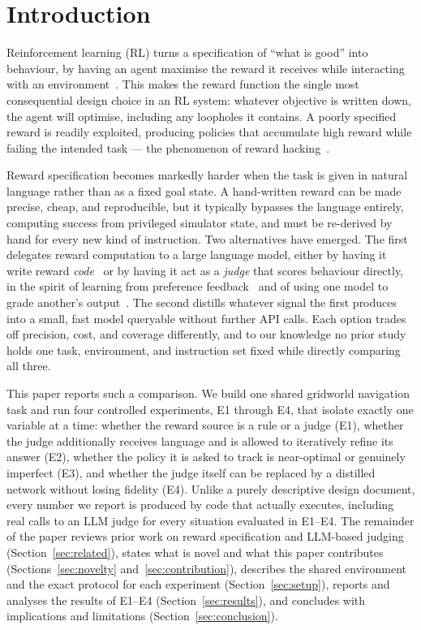 \documentclass[10pt,twocolumn]{article}
\begin{document}
\section{Introduction}
\label{sec:intro}

Reinforcement learning (RL) turns a specification of ``what is good''
into behaviour, by having an agent maximise the reward it receives while
interacting with an environment~\citep{sutton2018rl}. This makes the
reward function the single most consequential design choice in an RL
system: whatever objective is written down, the agent will optimise,
including any loopholes it contains. A poorly specified reward is
readily exploited, producing policies that accumulate high reward while
failing the intended task --- the phenomenon of reward
hacking~\citep{amodei2016concrete}.

Reward specification becomes markedly harder when the task is given in
natural language rather than as a fixed goal state. A hand-written
reward can be made precise, cheap, and reproducible, but it typically
bypasses the language entirely, computing success from privileged
simulator state, and must be re-derived by hand for every new kind of
instruction. Two alternatives have emerged. The first delegates reward
computation to a large language model, either by having it write reward
\emph{code}~\citep{ma2024eureka,xie2024text2reward} or by having it act
as a \emph{judge} that scores behaviour directly, in the spirit of
learning from preference feedback~\citep{christiano2017rlhf} and of
using one model to grade another's output~\citep{zheng2023judging}. The
second distills whatever signal the first produces into a small, fast
model queryable without further API calls. Each option trades off
precision, cost, and coverage differently, and to our knowledge no prior
study holds one task, environment, and instruction set fixed while
directly comparing all three.

This paper reports such a comparison. We build one shared gridworld
navigation task and run four controlled experiments, E1 through E4, that
isolate exactly one variable at a time: whether the reward source is a
rule or a judge (E1), whether the judge additionally receives language
and is allowed to iteratively refine its answer (E2), whether the policy
it is asked to track is near-optimal or genuinely imperfect (E3), and
whether the judge itself can be replaced by a distilled network without
losing fidelity (E4). Unlike a purely descriptive design document, every
number we report is produced by code that actually executes, including
real calls to an LLM judge for every situation evaluated in E1--E4. The
remainder of the paper reviews prior work on reward specification and
LLM-based judging (Section~\ref{sec:related}), states what is novel and
what this paper contributes (Sections~\ref{sec:novelty}
and~\ref{sec:contribution}), describes the shared environment and the
exact protocol for each experiment
(Section~\ref{sec:setup}), reports and analyses the results of E1--E4
(Section~\ref{sec:results}), and concludes with implications and
limitations (Section~\ref{sec:conclusion}).
\end{document}
